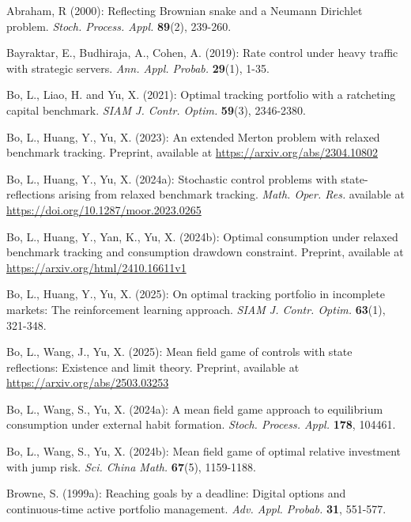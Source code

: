\documentclass[11pt,times,letter]{article}
\numberwithin{equation}{section}
\begin{document}
\begin{thebibliography}{}
{\small
{}Abraham, R (2000): Reflecting Brownian snake and a Neumann Dirichlet problem. {\it Stoch. Process. Appl.} {\bf 89}(2), 239-260.

  Bayraktar, E.,  Budhiraja, A., Cohen, A. (2019): Rate control under heavy traffic with strategic servers. {\it Ann. Appl. Probab.} \textbf{29}(1), 1-35.

 Bo, L., Liao, H. and Yu, X. (2021): Optimal tracking portfolio with a ratcheting capital benchmark. {\it SIAM J. Contr. Optim.} \textbf{59}(3), 2346-2380.

 Bo, L., Huang, Y., Yu, X. (2023): An extended Merton problem with relaxed benchmark tracking. Preprint, available at \url{https://arxiv.org/abs/2304.10802}

 Bo, L., Huang, Y., Yu, X. (2024a): Stochastic control problems with state-reflections arising from relaxed benchmark tracking. {\it Math. Oper. Res.} available at \url{https://doi.org/10.1287/moor.2023.0265}

 Bo, L., Huang, Y., Yan, K., Yu, X. (2024b): Optimal consumption under relaxed benchmark tracking and consumption drawdown constraint. Preprint, available at \url{https://arxiv.org/html/2410.16611v1}

 Bo, L., Huang, Y., Yu, X. (2025): On optimal tracking portfolio in incomplete markets: The reinforcement learning approach.  {\it  SIAM J. Contr. Optim.} {\bf 63}(1), 321-348.

 Bo, L., Wang, J., Yu, X. (2025):  Mean field game of controls with state reflections: Existence and limit theory. Preprint, available at \url{https://arxiv.org/abs/2503.03253}

 Bo, L., Wang, S., Yu, X. (2024a): A mean field game approach to equilibrium consumption under external habit formation. {\it Stoch. Process. Appl.} {\bf 178}, 104461.

 Bo, L., Wang, S., Yu, X. (2024b): Mean field game of optimal relative investment with jump risk. {\it Sci. China Math.} {\bf 67}(5), 1159-1188.

 Browne, S. (1999a): Reaching goals by a deadline: Digital options and continuous-time active portfolio management. {\it Adv. Appl. Probab.} {\bf 31}, 551-577.

}
\end{thebibliography}
\end{document}
